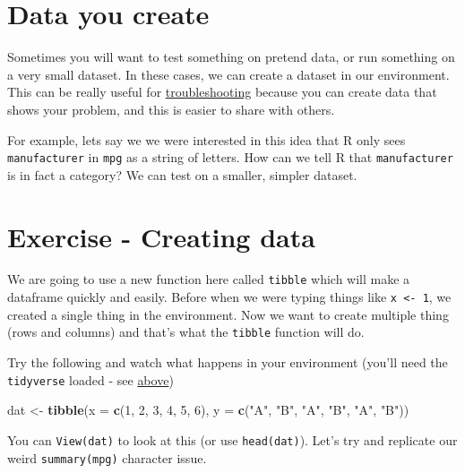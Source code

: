\documentclass[
]{book}
\newenvironment{Shaded}{\begin{snugshade}}{\end{snugshade}}
\newcommand{\DataTypeTok}[1]{\textcolor[rgb]{0.13,0.29,0.53}{#1}}
\newcommand{\DecValTok}[1]{\textcolor[rgb]{0.00,0.00,0.81}{#1}}
\newcommand{\KeywordTok}[1]{\textcolor[rgb]{0.13,0.29,0.53}{\textbf{#1}}}
\newcommand{\NormalTok}[1]{#1}
\newcommand{\StringTok}[1]{\textcolor[rgb]{0.31,0.60,0.02}{#1}}
\begin{document}
\hypertarget{created_data}{%
\section{Data you create}\label{created_data}}

Sometimes you will want to test something on pretend data, or run something on a very small dataset. In these cases, we can create a dataset in our environment. This can be really useful for \protect\hyperlink{trouble}{troubleshooting} because you can create data that shows your problem, and this is easier to share with others.

For example, lets say we we were interested in this idea that R only sees \texttt{manufacturer} in \texttt{mpg} as a string of letters. How can we tell R that \texttt{manufacturer} is in fact a category? We can test on a smaller, simpler dataset.

\hypertarget{ex_createdata}{%
\section{Exercise - Creating data}\label{ex_createdata}}

We are going to use a new function here called \texttt{tibble} which will make a dataframe quickly and easily. Before when we were typing things like \texttt{x\ \textless{}-\ 1}, we created a single thing in the environment. Now we want to create multiple thing (rows and columns) and that's what the \texttt{tibble} function will do.

Try the following and watch what happens in your environment (you'll need the \texttt{tidyverse} loaded - see \protect\hyperlink{data}{above})

\begin{Shaded}
\begin{Highlighting}[]
\NormalTok{dat <-}\StringTok{ }\KeywordTok{tibble}\NormalTok{(}\DataTypeTok{x =} \KeywordTok{c}\NormalTok{(}\DecValTok{1}\NormalTok{, }\DecValTok{2}\NormalTok{, }\DecValTok{3}\NormalTok{, }\DecValTok{4}\NormalTok{, }\DecValTok{5}\NormalTok{, }\DecValTok{6}\NormalTok{),}
              \DataTypeTok{y =} \KeywordTok{c}\NormalTok{(}\StringTok{"A"}\NormalTok{, }\StringTok{"B"}\NormalTok{, }\StringTok{"A"}\NormalTok{, }\StringTok{"B"}\NormalTok{, }\StringTok{"A"}\NormalTok{, }\StringTok{"B"}\NormalTok{))}
\end{Highlighting}
\end{Shaded}

You can \texttt{View(dat)} to look at this (or use \texttt{head(dat)}). Let's try and replicate our weird \texttt{summary(mpg)} character issue.
\end{document}
